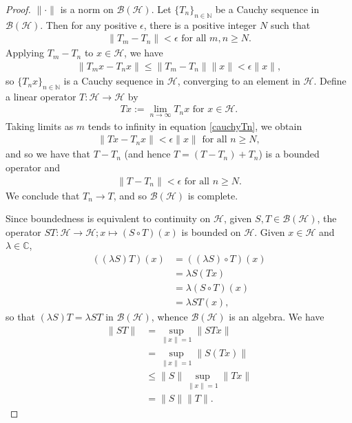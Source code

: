 \documentclass[12pt,a4paper]{amsart}
\theoremstyle{plain}
\theoremstyle{definition}
\renewcommand{\H}{\mathcal{H}}
\newcommand{\B}{\mathcal{B}}
\newcommand{\BH}{\mathcal{\B(\H)}}
\newcommand{\1}{\mathbbm{1}}
\newcommand{\C}{\mathbb{C}}
\newcommand{\N}{\mathbb{N}}
\begin{document}
\begin{proof}
	$\|\cdot\|$ is a norm on $\BH$. Let $\{T_n\}_{n\in\N}$ be a Cauchy sequence 
	in $\BH$. Then for any positive $\epsilon$, there is a positive integer $N$ such that 
	\begin{align*}
		\|T_m-T_n\| < \epsilon \mbox{ for all } m,n \geq N.
	\end{align*}
	Applying $T_m-T_n$ to $x \in \H$, we have 
	\begin{align}\label{cauchyTn}
		\|T_mx-T_nx\| \leq \|T_m-T_n\| \|x\| < \epsilon \|x\|,
	\end{align}
	so $\{T_nx\}_{n\in\N}$ is a Cauchy sequence in $\H$, converging to an element in $\H$.
	Define a linear operator $T:\H \to \H$ by 
	\begin{align*}
		Tx:= \lim_{n\to\infty}{T_nx} \mbox{ for } x \in \H.
	\end{align*}
	Taking limits as $m$ tends to infinity in equation \eqref{cauchyTn}, we obtain
	\begin{align*}
		\|Tx-T_nx\| < \epsilon \|x\| \mbox{ for all }n \geq N,
	\end{align*}
	and so we have that $T-T_n$ (and hence $T=(T-T_n)+T_n$) is a bounded operator and  
	\begin{align*}
		\|T-T_n\| <\epsilon \mbox{ for all }n \geq N.
	\end{align*}
	We conclude that $T_n \to T$, and so $\BH$ is complete.
	
	Since boundedness is equivalent to continuity on $\H$, given $S,T\in\BH$, the operator 
	$ST:\H \to \H; x \mapsto (S\circ T)(x)$ is bounded on $\H$.
	Given $x\in\H$ and $\lambda\in\C$, 
	\begin{align*}
			((\lambda S)T)(x)
		&=	((\lambda S)\circ T)(x)												\\
		&=	\lambda S(Tx)														\\
		&=	\lambda (S\circ T)(x)												\\
		&=	\lambda ST(x),
	\end{align*} 
	so that $(\lambda S)T = \lambda ST$ in $\BH$, whence $\BH$ is an algebra.
	We have 
	\begin{align*}
				\|ST\|
		&=		\sup_{\|x\|=1}{\|STx\|} 										\\
		&=		\sup_{\|x\|=1}{\|S(Tx)\|} 										\\
		&\leq	\|S\| \sup_{\|x\|=1}{\|Tx\|} 									\\
		&=		\|S\| \|T\|.
	\end{align*}
	

\end{proof}
\end{document}
